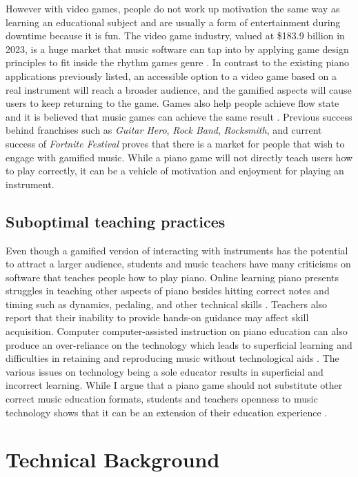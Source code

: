 \documentclass[10pt,twocolumn]{article}
\begin{document}
However with video games, people do not work up motivation the same way as learning an educational subject and are usually a form of entertainment during downtime because it is fun. The video game industry, valued at \$183.9 billion in 2023, is a huge market that music software can tap into by applying game design principles to fit inside the rhythm games genre \cite{GamingRevenue}. In contrast to the existing piano applications previously listed, an accessible option to a video game based on a real instrument will reach a broader audience, and the gamified aspects will cause users to keep returning to the game. Games also help people achieve flow state and it is believed that music games can achieve the same result \cite{Wagner}. Previous success behind franchises such as \textit{Guitar Hero}, \textit{Rock Band}, \textit{Rocksmith}, and current success of \textit{Fortnite Festival} proves that there is a market for people that wish to engage with gamified music. While a piano game will not directly teach users how to play correctly, it can be a vehicle of motivation and enjoyment for playing an instrument. 

\subsection{Suboptimal teaching practices}
Even though a gamified version of interacting with instruments has the potential to attract a larger audience, students and music teachers have many criticisms on software that teaches people how to play piano. Online learning piano presents struggles in teaching other aspects of piano besides hitting correct notes and timing such as dynamics, pedaling, and other technical skills \cite{PianoTeachingandthePandemic}. Teachers also report that their inability to provide hands-on guidance may affect skill acquisition\cite{E-LearningPiano}. Computer computer-assisted instruction on piano education can also produce an over-reliance on the technology which leads to superficial learning and difficulties in retaining and reproducing music without technological aids \cite{Computer-AssistedInstructionPianoEducation}. The various issues on technology being a sole educator results in superficial and incorrect learning. While I argue that a piano game should not substitute other correct music education formats, students and teachers openness to music technology shows that it can be an extension of their education experience \cite{PianoTeachingAndLearningConcerns}. 

\section{Technical Background}
\end{document}
